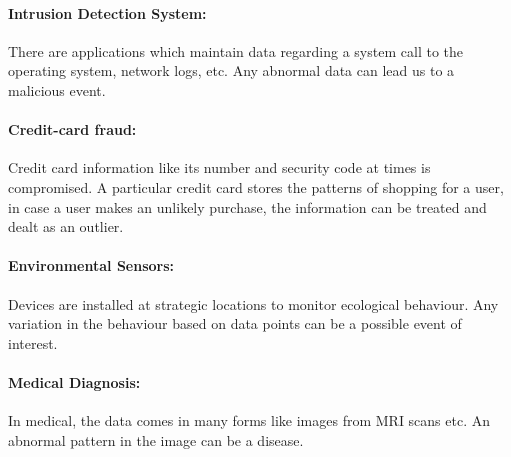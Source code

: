 \documentclass[runningheads]{llncs}
\begin{document}
\paragraph{Intrusion Detection System: }There are applications which maintain data regarding a system call to the operating system, network logs, etc. Any abnormal data can lead us to a malicious event.
\paragraph{Credit-card fraud:} Credit card information like its number and security code at times is compromised. A particular credit card stores the patterns of shopping for a user, in case a user makes an unlikely purchase, the information can be treated and dealt as an outlier.
\paragraph{Environmental Sensors:} Devices are installed at strategic locations to monitor ecological behaviour. Any variation in the behaviour based on data points can be a possible event of interest.
\paragraph{Medical Diagnosis:} In medical, the data comes in many forms like images from MRI scans etc. An abnormal pattern in the image can be a disease.

\end{document}
